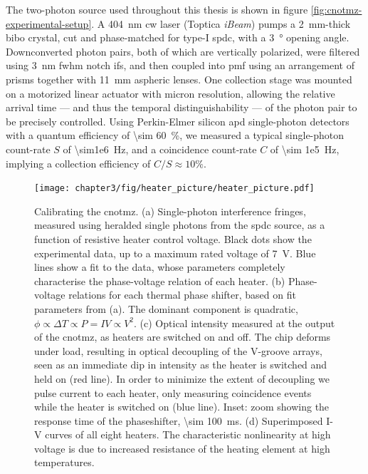 The two-photon source used throughout this thesis
is shown in figure \ref{fig:cnotmz-experimental-setup}. A \SI{404}{\nano \metre} \gls{cw} laser (Toptica \emph{iBeam}) pumps a \SI{2}{\milli \metre}-thick \gls{bibo} crystal, cut and phase-matched for type-I \gls{spdc}, with a \SI{3}{\degree} opening angle. Downconverted photon pairs, both of which are vertically polarized, were filtered using  \SI{3}{\nano \metre} \gls{fwhm} notch \glspl{if}, and then coupled into \gls{pmf} using an arrangement of prisms together with \SI{11}{\milli\metre} aspheric lenses.  One collection stage was mounted on a motorized linear actuator with micron resolution, allowing the relative arrival time --- and thus the temporal distinguishability --- of the photon pair to be precisely controlled. Using Perkin-Elmer silicon \gls{apd} single-photon detectors with a quantum efficiency of \SI{\sim 60}{\percent}, we measured a typical single-photon count-rate $S$ of \SI{\sim1e6}{\hertz}, and a coincidence count-rate $C$ of \SI{\sim 1e5}{\hertz}, implying a collection efficiency of $C/S \approx 10\%$. 

\begin{figure}[t!]
\centering
\texttt{[image: chapter3/fig/heater\_picture/heater\_picture.pdf]}
\caption[Calibrating the \acrshort{cnotmz}]
{
Calibrating the \gls{cnotmz}. (a) Single-photon interference fringes, measured using heralded single photons from the \gls{spdc} source, as a function of resistive heater control voltage. Black dots show the experimental data, up to a maximum rated voltage of \SI{7}{\volt}. Blue lines show a fit to the data, whose parameters completely characterise the phase-voltage relation of each heater. (b) Phase-voltage relations for each thermal phase shifter, based on fit parameters from (a). The dominant component is quadratic, $\phi \propto \Delta T \propto P = IV \propto V^2$. (c) Optical intensity measured at the output of the \gls{cnotmz}, as heaters are switched on and off. The chip deforms under load, resulting in optical decoupling of the V-groove arrays, seen as an immediate dip in intensity as the heater is switched and held on (red line). In order to minimize the extent of decoupling we pulse current to each heater, only measuring coincidence events while the heater is switched on (blue line). Inset: zoom showing the response time of the phaseshifter, \SI{\sim 100}{\milli \second}. (d) Superimposed I-V curves of all eight heaters. The characteristic nonlinearity at high voltage is due to increased resistance of the heating element at high temperatures.
}
\label{fig:calibration}
\end{figure}

